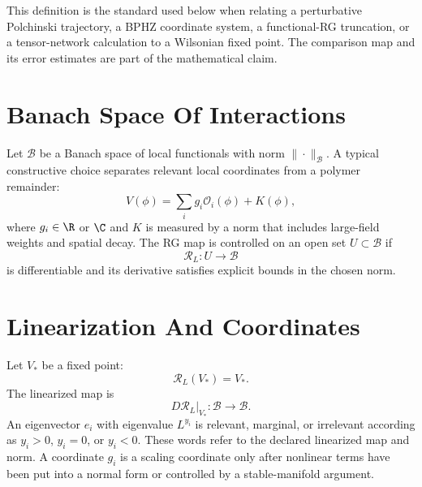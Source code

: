 This definition is the standard used below when relating a perturbative
Polchinski trajectory, a BPHZ coordinate system, a functional-RG truncation,
or a tensor-network calculation to a Wilsonian fixed point.  The comparison
map and its error estimates are part of the mathematical claim.

\section{Banach Space Of Interactions}

Let \(\mathcal B\) be a Banach space of local functionals with norm
\(\|\cdot\|_{\mathcal B}\).  A typical constructive choice separates relevant
local coordinates from a polymer remainder:
\[
  V(\phi)=\sum_i g_i\mathcal O_i(\phi)+K(\phi),
\]
where \(g_i\in\R\) or \(\C\) and \(K\) is measured by a norm that includes
large-field weights and spatial decay.  The RG map is controlled on an open
set \(U\subset\mathcal B\) if
\[
  \mathcal R_L:U\longrightarrow\mathcal B
\]
is differentiable and its derivative satisfies explicit bounds in the chosen
norm.

\section{Linearization And Coordinates}

Let \(V_\ast\) be a fixed point:
\[
  \mathcal R_L(V_\ast)=V_\ast .
\]
The linearized map is
\[
  D\mathcal R_L|_{V_\ast}:\mathcal B\to\mathcal B .
\]
An eigenvector \(e_i\) with eigenvalue \(L^{y_i}\) is relevant, marginal, or
irrelevant according as \(y_i>0\), \(y_i=0\), or \(y_i<0\).  These words refer
to the declared linearized map and norm.  A coordinate \(g_i\) is a scaling
coordinate only after nonlinear terms have been put into a normal form or
controlled by a stable-manifold argument.

